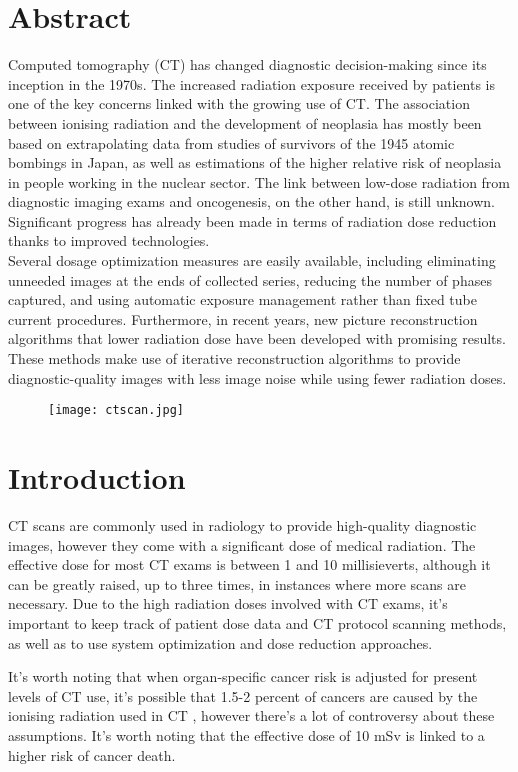 \documentclass[12pt]{article}
\begin{document}
\section*{ \huge Abstract}
\large
Computed tomography (CT) has changed diagnostic decision-making since its inception in the 1970s. The increased radiation exposure received by patients is one of the key concerns linked with the growing use of CT. The association between ionising radiation and the development of neoplasia has mostly been based on extrapolating data from studies of survivors of the 1945 atomic bombings in Japan, as well as estimations of the higher relative risk of neoplasia in people working in the nuclear sector. The link between low-dose radiation from diagnostic imaging exams and oncogenesis, on the other hand, is still unknown. Significant progress has already been made in terms of radiation dose reduction thanks to improved technologies.
\\
Several dosage optimization measures are easily available, including eliminating unneeded images at the ends of collected series, reducing the number of phases captured, and using automatic exposure management rather than fixed tube current procedures. Furthermore, in recent years, new picture reconstruction algorithms that lower radiation dose have been developed with promising results. These methods make use of iterative reconstruction algorithms to provide diagnostic-quality images with less image noise while using fewer radiation doses.
\begin{figure}[h]
\centering
\texttt{[image: ctscan.jpg]}
\end{figure}



\section*{ \huge Introduction}
\large
CT scans are commonly used in radiology to provide high-quality diagnostic images, however they come with a significant dose of medical radiation. The effective dose for most CT exams is between 1 and 10 millisieverts, although it can be greatly raised, up to three times, in instances where more scans are necessary. Due to the high radiation doses involved with CT exams, it's important to keep track of patient dose data and CT protocol scanning methods, as well as to use system optimization and dose reduction approaches.

It's worth noting that when organ-specific cancer risk is adjusted for present levels of CT use, it's possible that 1.5-2 percent of cancers are caused by the ionising radiation used in CT , however there's a lot of controversy about these assumptions. It's worth noting that the effective dose of 10 mSv is linked to a higher risk of cancer death.
\end{document}

